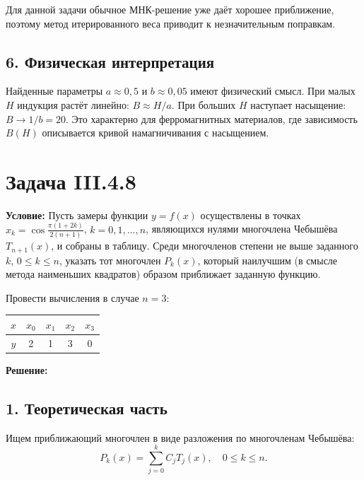 \documentclass{article}
\begin{document}
Для данной задачи обычное МНК-решение уже даёт хорошее приближение, поэтому метод итерированного веса приводит к незначительным поправкам.

\subsection*{6. Физическая интерпретация}

Найденные параметры $a \approx 0{,}5$ и $b \approx 0{,}05$ имеют физический смысл. При малых $H$ индукция растёт линейно: $B \approx H/a$. При больших $H$ наступает насыщение: $B \to 1/b = 20$. Это характерно для ферромагнитных материалов, где зависимость $B(H)$ описывается кривой намагничивания с насыщением.

\newpage
\section*{Задача III.4.8}

\textbf{Условие:} Пусть замеры функции $y = f(x)$ осуществлены в точках $x_k = \cos\frac{\pi(1+2k)}{2(n+1)}$, $k = 0, 1, \ldots, n$, являющихся нулями многочлена Чебышёва $T_{n+1}(x)$, и собраны в таблицу. Среди многочленов степени не выше заданного $k$, $0 \le k \le n$, указать тот многочлен $P_k(x)$, который наилучшим (в смысле метода наименьших квадратов) образом приближает заданную функцию.

Провести вычисления в случае $n = 3$:

\begin{center}
\begin{tabular}{|c|c|c|c|c|}
\hline
$x$ & $x_0$ & $x_1$ & $x_2$ & $x_3$ \\
\hline
$y$ & 2 & 1 & 3 & 0 \\
\hline
\end{tabular}
\end{center}

\vspace{0.5cm}
\textbf{Решение:}

\subsection*{1. Теоретическая часть}

Ищем приближающий многочлен в виде разложения по многочленам Чебышёва:
\begin{equation}
P_k(x) = \sum_{j=0}^{k} C_j T_j(x), \quad 0 \le k \le n.
\label{eq:48_pk}
\end{equation}
\end{document}
